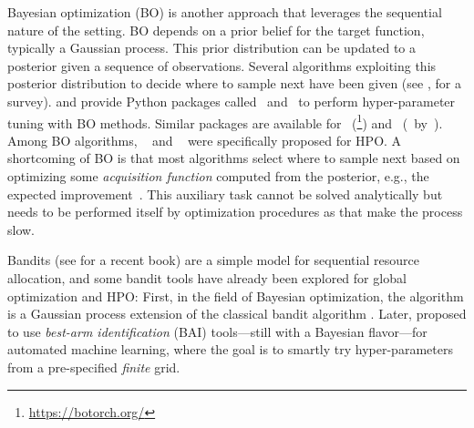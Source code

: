 Bayesian optimization (BO) is another approach that leverages the sequential nature of the setting. BO depends on a prior belief for the target function, typically a Gaussian process. This prior distribution can be updated to a posterior given a sequence of observations. Several algorithms exploiting this posterior distribution to decide where to sample next have been given (see  \citealp{shahriari2016loop}, for a survey). \citet{snoek2012spearmint} and \citet{klein2017robo} provide Python packages called \Spearmint\ and \RoBO\ to perform hyper-parameter tuning with BO methods. Similar packages are available for \PyTorch\ (\BoTorch\footnote{\url{https://botorch.org/}}) and \TensorFlow\ (\flow\ by~\citealt{knudde2017gpflowopt}). Among BO algorithms, \TPE~\citep{bergstra2011tpe} and \SMAC~\citep{hutter2011smac} were specifically proposed for HPO. A shortcoming of BO is that most algorithms select where to sample next based on optimizing some \emph{acquisition function} computed from the posterior, e.g., the expected improvement~\citep{jones1998ei}. This auxiliary  task cannot be solved analytically but needs to be performed itself by optimization procedures as \LBFGS that make the process slow. %

Bandits (see \citealp{lattimore2018} for a recent book) are a simple model for sequential resource allocation, and some bandit tools have already been explored for global optimization and HPO: First, in the field of Bayesian optimization, the \GPUCB algorithm \citep{srinivas2010gpucb} is a Gaussian process extension of the classical \UCB bandit algorithm \citep{auer2002ucb}. Later, \citet{hoffman2014bayesgap} proposed to use \emph{best-arm identification} (BAI) tools---still with a Bayesian flavor---for automated machine learning, where the goal is to smartly try hyper-parameters from a pre-specified \emph{finite} grid. 

